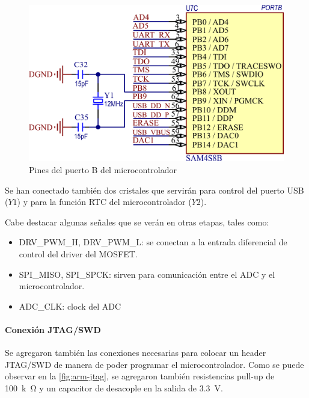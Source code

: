 \documentclass[titlepage, 12pt]{article}
\begin{document}
    \begin{figure}[!htbp]
        \centering
        \includegraphics[scale=1.5]{images/arm-gpio-port-b.png}
        \caption{Pines del puerto B del microcontrolador}
        \label{fig:arm-gpio-port-b}
    \end{figure}

Se han conectado también dos cristales que servirán para control del puerto USB ($Y1$) y para la función RTC del microcontrolador ($Y2$).

Cabe destacar algunas señales que se verán en otras etapas, tales como:
    \begin{itemize}
        \item DRV\_PWM\_H, DRV\_PWM\_L: se conectan a la entrada diferencial de control del driver del MOSFET.
        \item SPI\_MISO, SPI\_SPCK: sirven para comunicación entre el ADC y el microcontrolador.
        \item ADC\_CLK: clock del ADC
    \end{itemize}

\paragraph{Conexión JTAG/SWD}
Se agregaron también las conexiones necesarias para colocar un header JTAG/SWD de manera de poder programar el microcontrolador. Como se puede observar en la \autoref{fig:arm-jtag}, se agregaron también resistencias pull-up de \SI{100}{k\ohm} y un capacitor de desacople en la salida de \SI{3.3}{V}.
\end{document}
